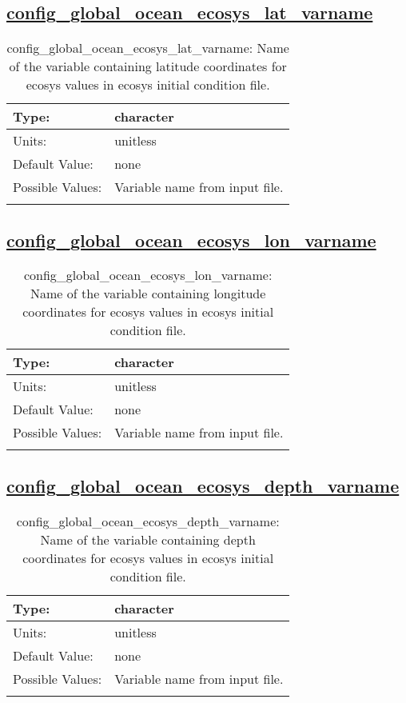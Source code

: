 \subsection[config\_global\_ocean\_ecosys\_lat\_varname]{\hyperref[sec:nm_tab_global_ocean]{config\_global\_ocean\_ecosys\_lat\_varname}}
\label{subsec:nm_sec_config_global_ocean_ecosys_lat_varname}
\begin{center}
\begin{longtable}{| p{2.0in} || p{4.0in} |}
    \hline
    Type: & character \\
    \hline
    Units: & \si{unitless} \\
    \hline
    Default Value: & none \\
    \hline
    Possible Values: & Variable name from input file. \\
    \hline
    \caption{config\_global\_ocean\_ecosys\_lat\_varname: Name of the variable containing latitude coordinates for ecosys values in ecosys initial condition file.}
\end{longtable}
\end{center}
\subsection[config\_global\_ocean\_ecosys\_lon\_varname]{\hyperref[sec:nm_tab_global_ocean]{config\_global\_ocean\_ecosys\_lon\_varname}}
\label{subsec:nm_sec_config_global_ocean_ecosys_lon_varname}
\begin{center}
\begin{longtable}{| p{2.0in} || p{4.0in} |}
    \hline
    Type: & character \\
    \hline
    Units: & \si{unitless} \\
    \hline
    Default Value: & none \\
    \hline
    Possible Values: & Variable name from input file. \\
    \hline
    \caption{config\_global\_ocean\_ecosys\_lon\_varname: Name of the variable containing longitude coordinates for ecosys values in ecosys initial condition file.}
\end{longtable}
\end{center}
\subsection[config\_global\_ocean\_ecosys\_depth\_varname]{\hyperref[sec:nm_tab_global_ocean]{config\_global\_ocean\_ecosys\_depth\_varname}}
\label{subsec:nm_sec_config_global_ocean_ecosys_depth_varname}
\begin{center}
\begin{longtable}{| p{2.0in} || p{4.0in} |}
    \hline
    Type: & character \\
    \hline
    Units: & \si{unitless} \\
    \hline
    Default Value: & none \\
    \hline
    Possible Values: & Variable name from input file. \\
    \hline
    \caption{config\_global\_ocean\_ecosys\_depth\_varname: Name of the variable containing depth coordinates for ecosys values in ecosys initial condition file.}
\end{longtable}
\end{center}
